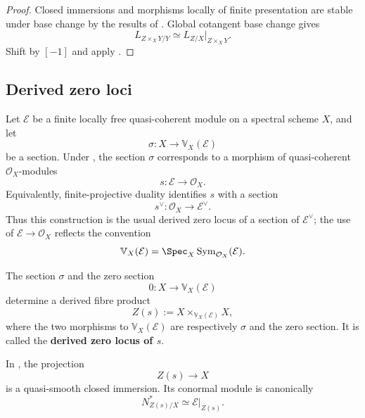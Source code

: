 \begin{proof}
Closed immersions and morphisms locally of finite presentation are stable
under base change by the results of
. Global cotangent base change gives
\[
    L_{Z\times_XY/Y}
    \simeq
    L_{Z/X}|_{Z\times_XY}.
\]
Shift by $[-1]$ and apply
.
\end{proof}

\subsection{Derived zero loci}

\begin{construction}
\label{con:derived-zero-locus}
Let $\mathcal E$ be a finite locally free quasi-coherent module on a
spectral scheme $X$, and let
\[
    \sigma
    \colon
    X
    \longrightarrow
    \mathbb V_X(\mathcal E)
\]
be a section. Under
, the section $\sigma$ corresponds
to a morphism of quasi-coherent $\mathcal O_X$-modules
\[
    s
    \colon
    \mathcal E
    \longrightarrow
    \mathcal O_X.
\]
Equivalently, finite-projective duality identifies $s$ with a section
\[
    s^\vee
    \colon
    \mathcal O_X
    \longrightarrow
    \mathcal E^\vee.
\]
Thus this construction is the usual derived zero locus of a section of
$\mathcal E^\vee$; the use of $\mathcal E\to\mathcal O_X$ reflects
the convention
\[
    \mathbb V_X(\mathcal E)
    =
    \Spec_X\operatorname{Sym}_{\mathcal O_X}(\mathcal E).
\]

The section $\sigma$ and the zero section
\[
    0
    \colon
    X
    \longrightarrow
    \mathbb V_X(\mathcal E)
\]
determine a derived fibre product
\[
    Z(s)
    :=
    X
    \times_{\mathbb V_X(\mathcal E)}
    X,
\]
where the two morphisms to $\mathbb V_X(\mathcal E)$ are respectively
$\sigma$ and the zero section. It is called the
\textbf{derived zero locus of $s$}.
\end{construction}

\begin{proposition}
\label{prop:derived-zero-locus-quasi-smooth}
In , the projection
\[
    Z(s)
    \longrightarrow
    X
\]
is a quasi-smooth closed immersion. Its conormal module is canonically
\[
    N^*_{Z(s)/X}
    \simeq
    \mathcal E|_{Z(s)}.
\]
\end{proposition}

